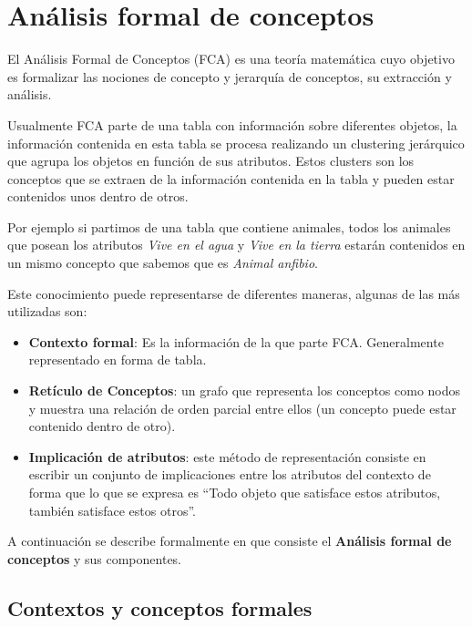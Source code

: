 
\chapter*{Análisis formal de conceptos}

	
	El Análisis Formal de Conceptos (FCA) es una teoría matemática cuyo objetivo es formalizar las nociones de concepto y jerarquía de conceptos, su extracción y análisis.
	
	Usualmente FCA parte de una tabla con información sobre diferentes objetos, la información contenida en esta tabla se procesa realizando un clustering jerárquico que agrupa los objetos en función de sus atributos. Estos clusters son los conceptos que se extraen de la información contenida en la tabla y pueden estar contenidos unos dentro de otros. 
	
	Por ejemplo si partimos de una tabla que contiene animales, todos los animales que posean los atributos \textit{Vive en el agua} y \textit{Vive en la tierra} estarán contenidos en un mismo concepto que sabemos que es \textit{Animal anfibio}.

	
	Este conocimiento puede representarse de diferentes maneras, algunas de las más utilizadas son:
	
	\begin{itemize}
		\item \textbf{Contexto formal}: Es la información de la que parte FCA. Generalmente representado en forma de tabla.
		
		\item  \textbf{Retículo de Conceptos}: un grafo que representa los conceptos como nodos
		y muestra una relación de orden parcial entre ellos (un concepto puede estar contenido dentro de otro).
		
		\item \textbf{Implicación de atributos}: este método de representación consiste en escribir un conjunto de implicaciones entre los atributos del contexto de forma que lo que se expresa es ``Todo objeto que satisface estos atributos, también satisface estos otros''.
	\end{itemize}

	A continuación se describe formalmente en que consiste el \textbf{Análisis formal de conceptos} y sus componentes.
	

\section*{Contextos y conceptos formales}

